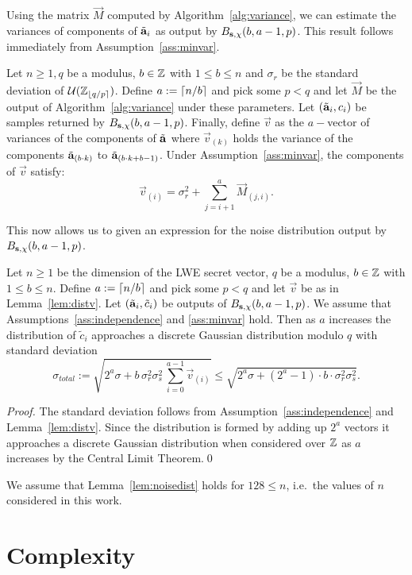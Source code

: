 Using the matrix $\vec{M}$ computed by Algorithm~\ref{alg:variance}, we can estimate the variances of components of $\tilde{\mathbf{a}}_i$ as 
output by $B_{\mathbf{s},\chi}(b,a-1,p)$. This result follows immediately from Assumption~\ref{ass:minvar}. 
\begin{lemma}
\label{lem:distv}
Let $n\ge 1, q$ be a modulus, $b \in \mathbb{Z}$ with $1 \leq b \le n$ and $\sigma_r$ be the standard deviation of $\mathcal{U}(\mathbb{Z}_{\left\lfloor{q/p}\right\rceil})$. 
Define $a := \lceil n/b \rceil$ and pick some $p < q$ and let $\vec{M}$ be the output of Algorithm~\ref{alg:variance} under these parameters.  
Let $(\tilde{\mathbf{a}}_i,c_i)$ be samples returned by $B_{\mathbf{s},\chi}(b,a-1,p)$. Finally, define $\vec{v}$ as the $a-$vector of variances of the 
components of $\tilde{\mathbf{a}}$ where $\vec{v}_{(k)}$ holds the variance of the components 
$\tilde{\mathbf{a}}_{(b\cdot k)}$ to $\tilde{\mathbf{a}}_{(b\cdot k +b-1)}$. Under Assumption~\ref{ass:minvar}, 
the components of $\vec{v}$ satisfy:
\[
 \vec{v}_{(i)} = \sigma_r^2 + \sum_{j=i+1}^{a} \vec{M}_{(j,i)}.
\]
\end{lemma}
This now allows us to given an expression for the noise distribution output by $B_{\mathbf{s},\chi}(b,a-1,p)$.
\begin{lemma}
\label{lem:noisedist}
Let $n\ge 1$ be the dimension of the \textnormal{LWE} secret vector, $q$ be a modulus, $b \in \mathbb{Z}$ with $1 \leq b \le n$. Define $a := \lceil n/b \rceil$ and pick some $p < q$ and let $\vec{v}$ be as in Lemma~\ref{lem:distv}. Let $(\tilde{\mathbf{a}}_i,\tilde c_i)$ be outputs of $B_{\mathbf{s},\chi}(b,a-1,p)$.  
We assume that Assumptions~\ref{ass:independence} and \ref{ass:minvar} hold. Then as $a$ increases the distribution of $\tilde c_i$ 
approaches a discrete Gaussian distribution modulo $q$ with standard deviation
$$\sigma_{total} := \sqrt{2^a\sigma + b\, \sigma_r^2 \sigma_s^2\, \sum_{i=0}^{a-1} \vec{v}_{(i)}} \leq \sqrt{2^a\sigma + (2^{a}-1) \cdot b \cdot \sigma_r^2 \sigma_s^2}.$$
\end{lemma}
\begin{proof}
The standard deviation follows from Assumption~\ref{ass:independence} and Lemma~\ref{lem:distv}. Since the distribution is formed by adding up $2^a$ vectors it approaches a discrete Gaussian distribution when considered over $\mathbb{Z}$ as $a$ increases by the Central Limit Theorem.\qed
\end{proof}
\begin{assumption}\label{last:assume}
We assume that Lemma~\ref{lem:noisedist} holds for $128 \leq n$, i.e.\ the values of $n$ considered in this work. 
\end{assumption}

\section{Complexity} \label{sec:complexity}

